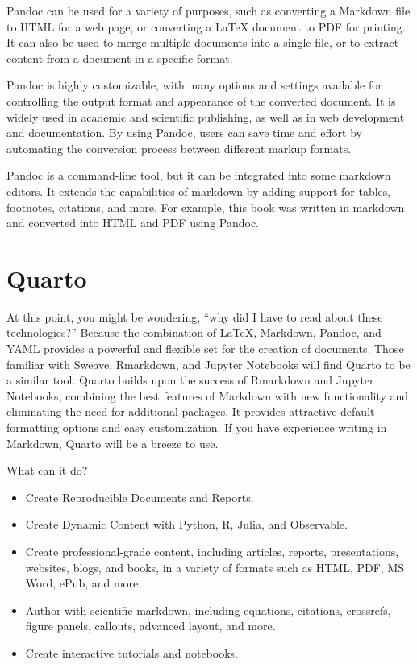 \documentclass[
  letterpaper,
]{book}
\providecommand{\tightlist}{%
  \setlength{\itemsep}{0pt}\setlength{\parskip}{0pt}}\usepackage{longtable,booktabs,array}
\begin{document}
Pandoc can be used for a variety of purposes, such as converting a
Markdown file to HTML for a web page, or converting a LaTeX document to
PDF for printing. It can also be used to merge multiple documents into a
single file, or to extract content from a document in a specific format.

Pandoc is highly customizable, with many options and settings available
for controlling the output format and appearance of the converted
document. It is widely used in academic and scientific publishing, as
well as in web development and documentation. By using Pandoc, users can
save time and effort by automating the conversion process between
different markup formats.

Pandoc is a command-line tool, but it can be integrated into some
markdown editors. It extends the capabilities of markdown by adding
support for tables, footnotes, citations, and more. For example, this
book was written in markdown and converted into HTML and PDF using
Pandoc.

\hypertarget{quarto}{%
\section{Quarto}\label{quarto}}

At this point, you might be wondering, ``why did I have to read about
these technologies?'' Because the combination of LaTeX, Markdown,
Pandoc, and YAML provides a powerful and flexible set for the creation
of documents. Those familiar with Sweave, Rmarkdown, and Jupyter
Notebooks will find Quarto to be a similar tool. Quarto builds upon the
success of Rmarkdown and Jupyter Notebooks, combining the best features
of Markdown with new functionality and eliminating the need for
additional packages. It provides attractive default formatting options
and easy customization. If you have experience writing in Markdown,
Quarto will be a breeze to use.

What can it do?

\begin{itemize}
\tightlist
\item
  Create Reproducible Documents and Reports.
\item
  Create Dynamic Content with Python, R, Julia, and Observable.
\item
  Create professional-grade content, including articles, reports,
  presentations, websites, blogs, and books, in a variety of formats
  such as HTML, PDF, MS Word, ePub, and more.
\item
  Author with scientific markdown, including equations, citations,
  crossrefs, figure panels, callouts, advanced layout, and more.
\item
  Create interactive tutorials and notebooks.
\end{itemize}
\end{document}
